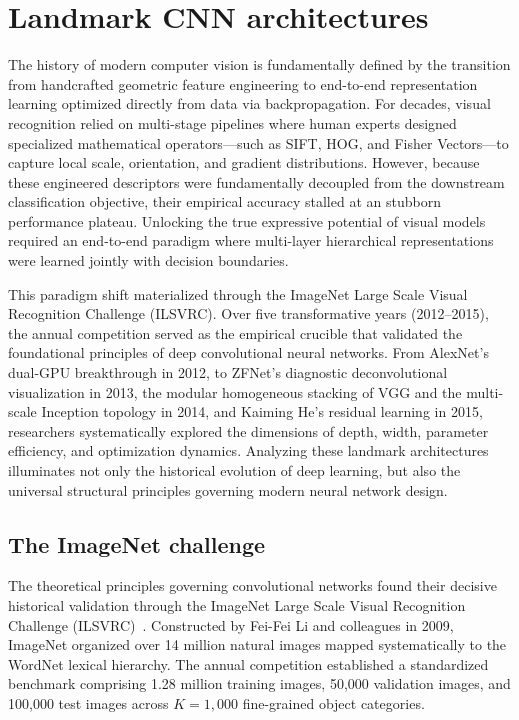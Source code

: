 \chapter{Landmark CNN architectures}
\label{sec:landmark_cnn_architectures}

The history of modern computer vision is fundamentally defined by the transition from handcrafted geometric feature engineering to end-to-end representation learning optimized directly from data via backpropagation. For decades, visual recognition relied on multi-stage pipelines where human experts designed specialized mathematical operators---such as SIFT, HOG, and Fisher Vectors---to capture local scale, orientation, and gradient distributions. However, because these engineered descriptors were fundamentally decoupled from the downstream classification objective, their empirical accuracy stalled at an stubborn performance plateau. Unlocking the true expressive potential of visual models required an end-to-end paradigm where multi-layer hierarchical representations were learned jointly with decision boundaries.

This paradigm shift materialized through the ImageNet Large Scale Visual Recognition Challenge (ILSVRC). Over five transformative years (2012--2015), the annual competition served as the empirical crucible that validated the foundational principles of deep convolutional neural networks. From AlexNet's dual-GPU breakthrough in 2012, to ZFNet's diagnostic deconvolutional visualization in 2013, the modular homogeneous stacking of VGG and the multi-scale Inception topology in 2014, and Kaiming He's residual learning in 2015, researchers systematically explored the dimensions of depth, width, parameter efficiency, and optimization dynamics. Analyzing these landmark architectures illuminates not only the historical evolution of deep learning, but also the universal structural principles governing modern neural network design.

\section{The ImageNet challenge}
\label{sec:imagenet_challenge}

The theoretical principles governing convolutional networks found their decisive historical validation through the ImageNet Large Scale Visual Recognition Challenge (ILSVRC)~\cite{deng2009imagenet,russakovsky2015imagenet}. Constructed by Fei-Fei Li and colleagues in 2009, ImageNet organized over 14 million natural images mapped systematically to the WordNet lexical hierarchy. The annual competition established a standardized benchmark comprising 1.28 million training images, 50,000 validation images, and 100,000 test images across $K = 1,000$ fine-grained object categories.

